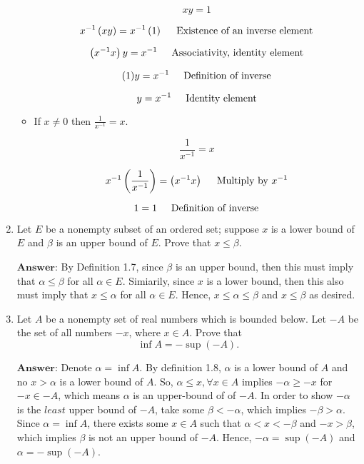 \documentclass[12pt]{article}
\begin{document}
\begin{enumerate}
\begin{itemize}
        \[xy = 1\]

        \[x^{-1}\left(xy\right) = x^{-1}\left(1\right) \hspace{0.5cm} \text{Existence of an inverse element}\]

        \[\left(x^{-1} x\right) y = x^{-1} \hspace{0.5cm} \text{Associativity, identity element}\]

        \[(1)y = x^{-1} \hspace{0.5cm} \text{Definition of inverse}\]

        \[y = x^{-1} \hspace{0.5cm} \text{Identity element}\]

        \item If $x \neq 0$ then $\frac{1}{x^{-1}} = x$.
        
        \[\frac{1}{x^{-1}} = x\]

        \[x^{-1}\left(\frac{1}{x^{-1}}\right) = \left(x^{-1}x\right) \hspace{0.5cm} \text{Multiply by } x^{-1}\]

        \[1 = 1 \hspace{0.5cm} \text{Definition of inverse}\]

     \end{itemize}
    
    \item Let $E$ be a nonempty subset of an ordered set; suppose $x$ is a lower bound of $E$ and $\beta$ is an upper bound of $E$. Prove that $x \leq \beta$.
    
    $\textbf{Answer:}$ By Definition 1.7, since $\beta$ is an upper bound, then this must imply that $\alpha \leq \beta$ for all $\alpha \in E$. Simiarily, since $x$ is
    a lower bound, then this also must imply that $x \leq \alpha$ for all $\alpha \in E$. Hence, $x \leq \alpha \leq \beta$ and $x \leq \beta$ as desired.
    
    \item Let $A$ be a nonempty set of real numbers which is bounded below. Let $-A$ be the set of all numbers $-x$, where $x \in A$. Prove that
    \[
    \inf A = -\sup(-A).
    \]

    $\textbf{Answer:}$  Denote $\alpha = \inf A$. By definition 1.8, $\alpha$ is a lower bound of $A$ and no $x > \alpha$ is a lower bound of $A$.
    So, $\alpha \leq x, \forall x \in A$ implies $-\alpha \geq -x$ for $-x \in -A$, 
    which means $\alpha$ is an upper-bound of of $-A$. In order to show $-\alpha$ is the $\textit{least}$ upper bound of $-A$,
    take some $\beta < -\alpha$, which implies $-\beta > \alpha$. Since $\alpha = \inf A$, there exists some $x \in A$
    such that $\alpha < x < -\beta$ and $-x > \beta$, which implies $\beta$ is not an upper bound of $-A$. Hence, $-\alpha = \sup(-A)$ and $\alpha = -\sup(-A)$.
    

\end{enumerate}
\end{document}
